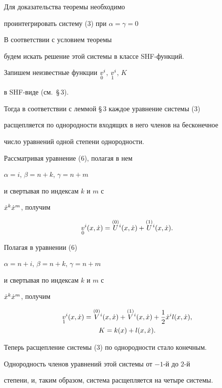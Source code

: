 \begin{pf} Для доказательства теоремы необходимо 


проинтегрировать систему (3) при $\alpha = \gamma = 0$ 


В соответствии с условием теоремы


будем искать решение этой системы в классе SHF-функций.


Запишем неизвестные функции $\sd{v}{0}^{i}$, $\sd{v}{1}^{i}$, $K$


в SHF-виде (см.~\S\,3). 


Тогда в соответствии с леммой \S\,3 каждое уравнение системы (3)


расщепляется по однородности входящих в него членов на бесконечное


число уравнений одной степени однородности. 


Рассматривая уравнение (6), полагая в нем


$\alpha = i$, $\beta = n + k$, $\gamma = n + m$ 


и свертывая по индексам $k$ и $m$ с 


$\xt^{k}\xt^{m}$, получим


$$


\sd{v}{0}^{i}(x,\xt) = 


\up{U}{(0)}{}^i(x,\xt) + 


\up{U}{(1)}{}^i(x,\xt).


$$


Полагая в уравнении (6)\;


$\alpha = n + i$, $\beta = n + k$, $\gamma = n + m$


и свертывая по индексам $k$ и $m$ с 


$\xt^{k}\xt^{m}$, получим


\begin{gather*}


\sd{v}{1}^{i}(x,\xt) = 


\up{V}{(0)}{}^i(x,\xt) + 


\up{V}{(1)}{}^i(x,\xt) +


\frac{1}{2}\xt^{i}l(x,\xt), \\


K = k(x) + l(x,\xt).


\end{gather*}


Теперь расщепление системы (3) по однородности стало конечным.


Однородность членов уравнений этой системы от $-1$-й до $2$-й 


степени, и, таким образом, система расщепляется на четыре системы.



\end{pf}
